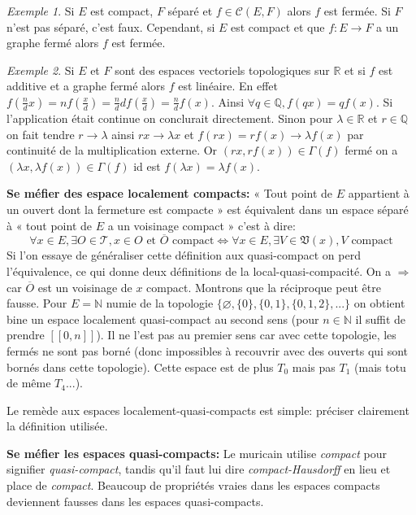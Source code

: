 \documentclass[a4paper, 11pt, french]{book}
\theoremstyle{plain} %
\theoremstyle{definition} %
\theoremstyle{remark} %
\newtheorem{exemple}{Exemple}
\newcommand{\1}{\mathds{1}}
\newcommand\vide{\varnothing}
\newcommand\et{\text{ et }}
\newcommand{\N}{\mathbb{N}}
\newcommand{\Q}{\mathbb{Q}}
\newcommand{\R}{\mathbb{R}}
\renewcommand{\cal}[1]{\mathcal{#1}}
\renewcommand{\frak}[1]{\mathfrak{#1}}
\newcommand{\scr}[1]{\mathscr{#1}}
\newcommand\intervalle[1]{[\![#1]\!]}
\begin{document}
\begin{exemple}
	Si $E$ est compact, $F$ séparé et $f\in\cal{C}(E, F)$ alors $f$ est fermée.
	Si $F$ n'est pas séparé, c'est faux.
	Cependant, si $E$ est compact et que $f:E\rightarrow F$ a un graphe fermé alors $f$ est fermée.
\end{exemple}

\begin{exemple}
	Si $E$ et $F$ sont des espaces vectoriels topologiques sur $\R$ et si $f$ est additive et a graphe fermé alors $f$ est linéaire.
	En effet $f(\frac{n}{d}x)=nf(\frac{x}{d})=\frac{n}{d}df(\frac{x}{d})=\frac{n}{d}f(x)$.
	Ainsi $\forall q\in\Q, f(qx)=qf(x)$.
	Si l'application était continue on conclurait directement.
	Sinon pour $\lambda\in\R$ et $r\in\Q$ on fait tendre $r\rightarrow\lambda$ ainsi $rx\rightarrow\lambda x$ et $f(rx)=rf(x)\rightarrow\lambda f(x)$ par continuité de la multiplication externe.
	Or $(rx, rf(x))\in\Gamma(f)$ fermé on a $(\lambda x, \lambda f(x))\in\Gamma(f)$ id est $f(\lambda x)=\lambda f(x)$.
\end{exemple}

\textbf{Se méfier des espace localement compacts:}
« Tout point de $E$ appartient à un ouvert dont la fermeture est compacte » est équivalent dans un espace séparé à « tout point de $E$ a un voisinage compact » c'est à dire:
$$
	\forall x\in E, \exists O\in\scr{T}, x\in O\et\overline{O}\text{ compact}
	\iff
	\forall x\in E, \exists V\in\frak{V}(x), V\text{ compact}
$$
Si l'on essaye de généraliser cette définition aux quasi-compact on perd l'équivalence, ce qui donne deux définitions de la local-quasi-compacité.
On a $\Rightarrow$ car $\overline{O}$ est un voisinage de $x$ compact.
Montrons que la réciproque peut être fausse.
Pour $E=\N$ numie de la topologie $\{\vide, \{0\}, \{0, 1\}, \{0, 1, 2\}, ...\}$ on obtient bine un espace localement quasi-compact au second sens (pour $n\in\N$ il suffit de prendre $\intervalle{0, n}$).
Il ne l'est pas au premier sens car avec cette topologie, les fermés ne sont pas borné (donc impossibles à recouvrir avec des ouverts qui sont bornés dans cette topologie).
Cette espace est de plus $T_0$ mais pas $T_1$ (mais totu de même $T_4$...).

Le remède aux espaces localement-quasi-compacts est simple: préciser clairement la définition utilisée.

\textbf{Se méfier les espaces quasi-compacts:}
Le muricain utilise \textit{compact} pour signifier \textit{quasi-compact}, tandis qu'il faut lui dire \textit{compact-Hausdorff} en lieu et place de \textit{compact}.
Beaucoup de propriétés vraies dans les espaces compacts deviennent fausses dans les espaces quasi-compacts.
\end{document}
